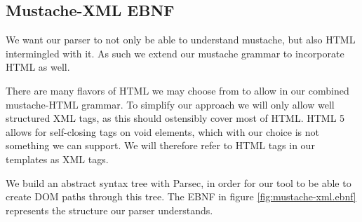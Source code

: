 \documentclass[thesis.tex]{subfiles}
\begin{document}
\subsection{Mustache-XML EBNF}
\label{sec:mustache-xml-ebnf}
We want our parser to not only be able to understand mustache, but also HTML
intermingled with it. As such we extend our mustache grammar to incorporate
HTML as well.

There are many flavors of HTML we may choose from to allow in our
combined mustache-HTML grammar. To simplify our approach we will only allow well
structured XML tags, as this should ostensibly cover most of HTML.
HTML 5 allows for self-closing tags on void elements, which with our choice is
not something we can support. We will therefore refer to HTML tags in our
templates as XML tags.

We build an abstract syntax tree with Parsec, in order for our tool to be
able to create DOM paths through this tree.
The EBNF in figure \ref{fig:mustache-xml.ebnf} represents the structure our
parser understands.
\end{document}
